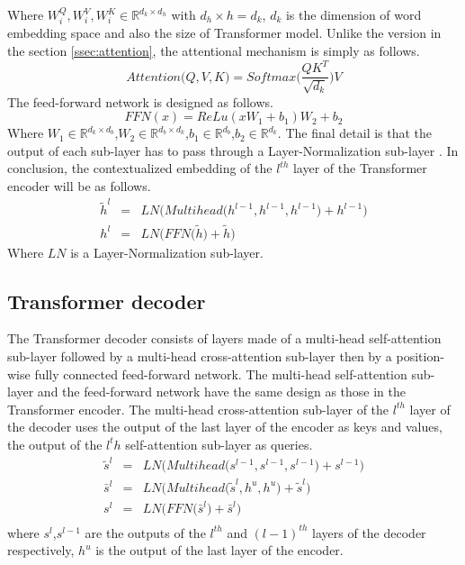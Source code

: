 Where $W_i^Q, W_i^V, W_i^K \in \mathbb{R}^{d_k \times d_h}$ with $d_h \times h = d_k$, $d_k$ is the dimension of word embedding space and also the size of Transformer model. Unlike the version in the section \ref{ssec:attention}, the attentional mechanism is simply as follows.
\begin{equation}
Attention\big( Q, V, K \big) = Softmax\big(\frac{Q K^T}{\sqrt{d_k}} \big) V
\end{equation}
The feed-forward network is designed as follows.
\begin{equation}
FFN(x) = ReLu(xW_1+b_1)W_2+b_2
\end{equation}
Where $W_1 \in \mathbb{R}^{d_k \times d_b}$,$W_2 \in \mathbb{R}^{d_b \times d_k}$,$b_1 \in \mathbb{R}^{d_b}$,$b_2 \in \mathbb{R}^{d_k}$.
The final detail is that the output of each sub-layer has to pass through a Layer-Normalization sub-layer \citep{Jimmy16layer}. In conclusion, the contextualized embedding of the $l^{th}$ layer of the Transformer encoder will be as follows.
\begin{equation}
\begin{array}{rcl}
\tilde{h}^l &=& LN\bigg(Multihead\big(h^{l-1}, h^{l-1}, h^{l-1}\big) + h^{l-1}\bigg) \\ 
h^l &=& LN\bigg(FFN\big(\tilde{h}\big) + \tilde{h}\bigg)
\end{array}
\end{equation}
Where $LN$ is a Layer-Normalization sub-layer.
\subsection{Transformer decoder}
The Transformer decoder consists of layers made of a multi-head self-attention sub-layer followed by a multi-head cross-attention sub-layer then by a position-wise fully connected feed-forward network. The multi-head self-attention sub-layer and the feed-forward network have the same design as those in the Transformer encoder. The multi-head cross-attention sub-layer of the $l^{th}$ layer of the decoder uses the output of the last layer of the encoder as keys and values, the output of the $l^th$ self-attention sub-layer as queries.
\begin{equation}
\begin{array}{rcl}
\tilde{s}^l &=& LN\bigg( Multihead\big( s^{l-1},s^{l-1},s^{l-1} \big) + s^{l-1} \bigg) \\
\bar{s}^l &=& LN\bigg( Multihead\big( \tilde{s}^l, h^u, h^u \big) + \tilde{s}^l \bigg) \\
s^l &=& LN\bigg( FFN\big( \bar{s}^l \big) + \bar{s}^l \bigg) \\
\end{array}
\end{equation}
where $s^l$,$s^{l-1}$ are the outputs of the $l^{th}$ and $(l-1)^{th}$ layers of the decoder respectively, $h^u$ is the output of the last layer of the encoder.


